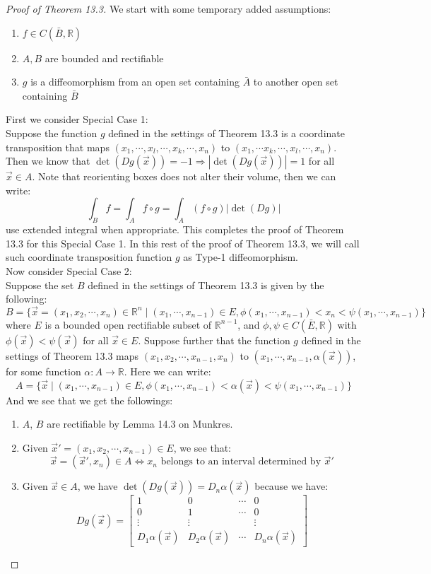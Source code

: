 \documentclass[11pt,oneside]{book}
\theoremstyle{break}
\theoremstyle{break}
\newcommand{\R}{\mathbb{R}}
\newcommand{\bmat}[1]{\begin{bmatrix} #1 \end{bmatrix}}
\begin{document}
\begin{proof}[Proof of Theorem 13.3]
\hfill\break
We start with some temporary added assumptions:
\begin{enumerate}[topsep=3pt,itemsep=-1ex,partopsep=1ex,parsep=1ex]
\item $f \in C(\bar{B},\R)$
\item $A,B$ are bounded and rectifiable
\item $g$ is a diffeomorphism from an open set containing $\bar{A}$ to another open set containing $\bar{B}$\\
\end{enumerate}

First we consider Special Case 1: \\
Suppose the function $g$ defined in the settings of Theorem 13.3 is a coordinate transposition that maps $(x_1,\cdots, x_l,\cdots,x_k,\cdots,x_n)$ to $(x_1,\cdots x_k, \cdots, x_l, \cdots, x_n)$. Then we know that $\det (Dg(\vec{x})) = -1 \Rightarrow |\det (Dg(\vec{x}))| =1$ for all $\vec{x}\in A$. Note that reorienting boxes does not alter their volume, then we can write:
$$\int_B f = \int_A f\circ g = \int_A (f\circ g)|\det(Dg)|$$ use extended integral when appropriate. This completes the proof of Theorem 13.3 for this Special Case 1. In this rest of the proof of Theorem 13.3, we will call such coordinate transposition function $g$ as Type-1 diffeomorphism.\\


Now consider Special Case 2: \\
Suppose the set $B$ defined in the settings of Theorem 13.3 is given by the following: 
$$B = \{ \vec{x}=(x_1,x_2,\cdots,x_n)\in \R^n\mid (x_1,\cdots, x_{n-1}) \in E, \phi(x_1,\cdots, x_{n-1}) < x_n < \psi(x_1,\cdots, x_{n-1})\}$$
where $E$ is a bounded open rectifiable subset of $\R^{n-1}$, and $\phi,\psi \in C(\bar{E}, \R)$ with $\phi(\vec{x}) < \psi(\vec{x}) $ for all $\vec{x}\in E$. Suppose further that the function $g$ defined in the settings of Theorem 13.3 maps $(x_1,x_2,\cdots, x_{n-1}, x_n)$ to $(x_1,\cdots, x_{n-1}, \alpha(\vec{x}))$, for some function $\alpha:A \to \R$. Here we can write: 
$$A = \{ \vec{x}\mid (x_1,\cdots,x_{n-1}) \in E , \phi(x_1,\cdots, x_{n-1}) < \alpha(\vec{x}) < \psi(x_1,\cdots,x_{n-1})\}$$
And we see that we get the followings:
\begin{enumerate}[topsep=3pt,itemsep=-1ex,partopsep=1ex,parsep=1ex]
\item $A$, $B$ are rectifiable by Lemma 14.3 on Munkres.
\item Given $\vec{x}' = (x_1,x_2,\cdots, x_{n-1}) \in E$, we see that: $$\vec{x}=(\vec{x}',x_n) \in A \iff x_n \text{ belongs to an interval determined by } \vec{x}'$$
\item Given $\vec{x}\in A$, we have $\det(Dg(\vec{x})) = D_n\alpha(\vec{x})$ because we have:
$$Dg(\vec{x})= \bmat{1&0&\cdots&0 \\ 0 & 1 & \cdots & 0 \\ \vdots &\vdots & &\vdots \\ D_1\alpha(\vec{x})& D_2\alpha(\vec{x}) &\cdots &D_n \alpha(\vec{x})}$$
\end{enumerate}


\end{proof}
\end{document}
